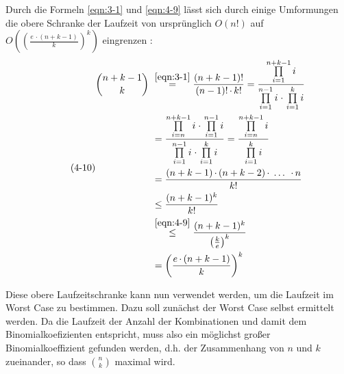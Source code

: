 Durch die Formeln \eqref{eqn:3-1} und \eqref{eqn:4-9} lässt sich durch einige Umformungen die obere Schranke der Laufzeit von ursprünglich $ O(n!) $  auf $ O\left( \left( \frac{e \, \cdotp (n + k - 1)}{k}\right)^k\right) $ eingrenzen \cite{script_binom}:
\begin{equation} \label{eqn:4-10}
\tag{4-10}
\begin{aligned}
\binom{n + k - 1}{k} &\ {} \overset{\eqref{eqn:3-1}}{=}  \frac{(n+k-1)!}{(n-1)!\, \cdotp k!} = \frac{\prod\limits_{i=1}^{n+k-1}i}{\prod\limits_{i=1}^{n-1}i \; \cdotp \, \prod\limits_{i=1}^{k}i}  \\
&\ = \frac{\prod\limits_{i=n}^{n+k-1}i \; \cdotp \, \prod\limits_{i=1}^{n-1}i}{\prod\limits_{i=1}^{n-1}i \; \cdotp \, \prod\limits_{i=1}^{k}i} = \frac{\prod\limits_{i=n}^{n+k-1}i}{\prod\limits_{i=1}^{k}i}\\
&\ = \frac{(n + k - 1) \, \cdotp (n + k - 2)\, \cdotp \; \dots \; \, \cdotp n}{k!} \\
&\ \leq \frac{(n + k - 1)^k}{k!} \\
&\ \overset{\eqref{eqn:4-9}}{\leq} \frac{(n + k - 1)^k}{\left( \frac{k}{e} \right) ^k} \\
&\ = \left( \frac{e \, \cdotp (n + k - 1)}{k}\right)^k  \\
\end{aligned}
\end{equation} 

Diese obere Laufzeitschranke kann nun verwendet werden, um die Laufzeit im Worst Case zu bestimmen. Dazu soll zunächst der Worst Case selbst ermittelt werden. Da die Laufzeit der Anzahl der Kombinationen und damit dem Binomialkoefizienten entspricht, muss also ein möglichst großer Binomialkoeffizient gefunden werden, d.h. der Zusammenhang von $n$ und $k$ zueinander, so dass $\binom{n}{k}$ maximal wird.\\

